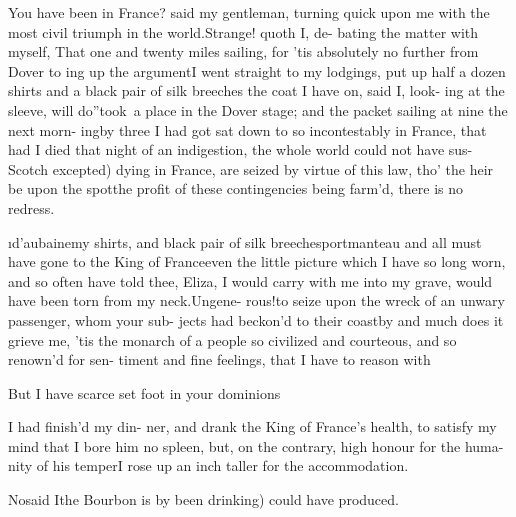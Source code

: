 \documentclass[twoside]{article}
\begin{document}
\tsk You have been in France? said 
my gentleman, turning quick upon 
me with the most civil triumph in 
the world.\tsk Strange! quoth I, de-
bating the matter with myself, That 
one and twenty miles sailing, for ’tis 
absolutely no further from Dover to 
ing up the argument\tsk I went straight
to my lodgings, put up half a dozen
shirts and a black pair of silk breeches
\tsk \lqq the coat I have on, said I, look-
ing at the sleeve, will do”\tsk took~a 
place in the Dover stage; and the
packet sailing at nine the next morn-
ing\tsk by three I had got sat down to 
so incontestably in France, that had 
I died that night of an indigestion, 
the whole world could not have sus-
\vfill %
\bgroup\fontsize{9}{12}\selectfont\noindent
{}
Scotch excepted) dying in France, are seized 
by virtue of this law, tho’ the heir be upon 
the spot\tsh the profit of these contingencies 
being farm’d, there is no redress.\par\egroup
{}
\i{d’aubaine}\tsk my shirts, and black pair 
of silk breeches\tsk portmanteau and 
all must have gone to the King of 
France\tsk even the little picture which 
I have so long worn, and so often 
have told thee, Eliza, I would carry 
with me into my grave, would have 
been torn from my neck.\tsk Ungene-
rous!\tsk to seize upon the wreck of an 
unwary passenger, whom your sub-
jects had beckon’d to their coast\tsk by 
and much does it grieve me, ’tis the 
monarch of a people so civilized and 
courteous, and so renown’d for sen-
timent and fine feelings, that I have 
to reason with\tsh

But I have scarce set foot in your\break
dominions\tsh


\vskip 2pt

 I had finish’d my din-
ner, and drank the King\break
of France’s health, to satisfy my mind 
that I bore him no spleen, but, on the
contrary, high honour for the huma-
nity of his temper\tsk I rose up an inch
taller for the accommodation.

\tsk No\tsk said I\tsk the Bourbon is by\break
{}
been drinking) could have produced.
\end{document}
